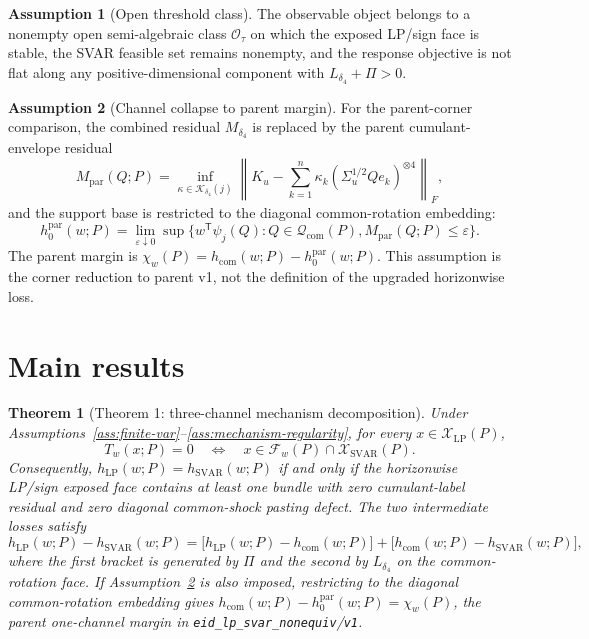 \documentclass[11pt]{article}
\newcommand{\transpose}{\mathsf{T}}
\theoremstyle{definition}
\newtheorem{assumption}{Assumption}
\theoremstyle{plain}
\newtheorem{theorem}{Theorem}
\theoremstyle{remark}
\begin{document}
\begin{assumption}[Open threshold class]\label{ass:open-threshold-class}
The observable object belongs to a nonempty open semi-algebraic class \(\mathcal O_\tau\) on which the exposed LP/sign face is stable, the SVAR feasible set remains nonempty, and the response objective is not flat along any positive-dimensional component with \(L_{\delta_4}+\Pi>0\).
\end{assumption}

\begin{assumption}[Channel collapse to parent margin]\label{ass:channel-collapse}
For the parent-corner comparison, the combined residual \(M_{\delta_4}\) is replaced by the parent cumulant-envelope residual
\[
M_{\mathrm{par}}(Q;P)=\inf_{\kappa\in\mathcal K_{\delta_4}(j)}
\left\|K_u-\sum_{k=1}^n\kappa_k(\Sigma_u^{1/2}Qe_k)^{\otimes4}\right\|_F,
\]
and the support base is restricted to the diagonal common-rotation embedding:
\[
h^{\mathrm{par}}_0(w;P)=\lim_{\varepsilon\downarrow0}
\sup\{w^\transpose\psi_j(Q):Q\in\mathcal Q_{\mathrm{com}}(P),M_{\mathrm{par}}(Q;P)\le\varepsilon\}.
\]
The parent margin is \(\chi_w(P)=h_{\mathrm{com}}(w;P)-h^{\mathrm{par}}_0(w;P)\).  This assumption is the corner reduction to parent v1, not the definition of the upgraded horizonwise loss.
\end{assumption}

\section{Main results}
\begin{theorem}[Theorem 1: three-channel mechanism decomposition]\label{thm:mechanism-decomposition}
Under Assumptions~\ref{ass:finite-var}--\ref{ass:mechanism-regularity}, for every \(x\in\mathcal X_{\mathrm{LP}}(P)\),
\[
T_w(x;P)=0
\quad\Longleftrightarrow\quad
x\in\mathcal F_w(P)\cap\mathcal X_{\mathrm{SVAR}}(P).
\]
Consequently, \(h_{\mathrm{LP}}(w;P)=h_{\mathrm{SVAR}}(w;P)\) if and only if the horizonwise LP/sign exposed face contains at least one bundle with zero cumulant-label residual and zero diagonal common-shock pasting defect.  The two intermediate losses satisfy
\[
h_{\mathrm{LP}}(w;P)-h_{\mathrm{SVAR}}(w;P)
=\bigl[h_{\mathrm{LP}}(w;P)-h_{\mathrm{com}}(w;P)\bigr]
+\bigl[h_{\mathrm{com}}(w;P)-h_{\mathrm{SVAR}}(w;P)\bigr],
\]
where the first bracket is generated by \(\Pi\) and the second by \(L_{\delta_4}\) on the common-rotation face.  If Assumption~\ref{ass:channel-collapse} is also imposed, restricting to the diagonal common-rotation embedding gives \(h_{\mathrm{com}}(w;P)-h^{\mathrm{par}}_0(w;P)=\chi_w(P)\), the parent one-channel margin in \texttt{eid\_lp\_svar\_nonequiv}/\texttt{v1}.
\end{theorem}
\end{document}
